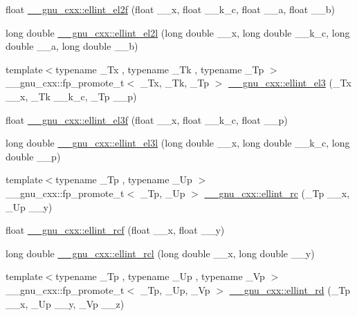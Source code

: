 \begin{DoxyCompactItemize}
\item 
float \hyperlink{group__mathsf__gnu_ga0bf7469fe7ac92e9a2ffa0f92ea62248}{\+\_\+\+\_\+gnu\+\_\+cxx\+::ellint\+\_\+el2f} (float \+\_\+\+\_\+x, float \+\_\+\+\_\+k\+\_\+c, float \+\_\+\+\_\+a, float \+\_\+\+\_\+b)
\item 
long double \hyperlink{group__mathsf__gnu_ga491439a09e6000659444f52dc3c9f215}{\+\_\+\+\_\+gnu\+\_\+cxx\+::ellint\+\_\+el2l} (long double \+\_\+\+\_\+x, long double \+\_\+\+\_\+k\+\_\+c, long double \+\_\+\+\_\+a, long double \+\_\+\+\_\+b)
\item 
{\footnotesize template$<$typename \+\_\+\+Tx , typename \+\_\+\+Tk , typename \+\_\+\+Tp $>$ }\\\+\_\+\+\_\+gnu\+\_\+cxx\+::fp\+\_\+promote\+\_\+t$<$ \+\_\+\+Tx, \+\_\+\+Tk, \+\_\+\+Tp $>$ \hyperlink{group__mathsf__gnu_gaac07922e08fdf46cd509ff0cfa9ea1f0}{\+\_\+\+\_\+gnu\+\_\+cxx\+::ellint\+\_\+el3} (\+\_\+\+Tx \+\_\+\+\_\+x, \+\_\+\+Tk \+\_\+\+\_\+k\+\_\+c, \+\_\+\+Tp \+\_\+\+\_\+p)
\item 
float \hyperlink{group__mathsf__gnu_ga66131a8ecc14b5228a73a01121f60a35}{\+\_\+\+\_\+gnu\+\_\+cxx\+::ellint\+\_\+el3f} (float \+\_\+\+\_\+x, float \+\_\+\+\_\+k\+\_\+c, float \+\_\+\+\_\+p)
\item 
long double \hyperlink{group__mathsf__gnu_ga0d90e66f799a2ebe4bec43eef0d53355}{\+\_\+\+\_\+gnu\+\_\+cxx\+::ellint\+\_\+el3l} (long double \+\_\+\+\_\+x, long double \+\_\+\+\_\+k\+\_\+c, long double \+\_\+\+\_\+p)
\item 
{\footnotesize template$<$typename \+\_\+\+Tp , typename \+\_\+\+Up $>$ }\\\+\_\+\+\_\+gnu\+\_\+cxx\+::fp\+\_\+promote\+\_\+t$<$ \+\_\+\+Tp, \+\_\+\+Up $>$ \hyperlink{group__mathsf__gnu_ga7d3d42f5f71a74266be8aaca528056bf}{\+\_\+\+\_\+gnu\+\_\+cxx\+::ellint\+\_\+rc} (\+\_\+\+Tp \+\_\+\+\_\+x, \+\_\+\+Up \+\_\+\+\_\+y)
\item 
float \hyperlink{group__mathsf__gnu_gaad5316092224ec3d92b66e79ef266adf}{\+\_\+\+\_\+gnu\+\_\+cxx\+::ellint\+\_\+rcf} (float \+\_\+\+\_\+x, float \+\_\+\+\_\+y)
\item 
long double \hyperlink{group__mathsf__gnu_ga9b2f1cdeacd3615c702a77d995a0129c}{\+\_\+\+\_\+gnu\+\_\+cxx\+::ellint\+\_\+rcl} (long double \+\_\+\+\_\+x, long double \+\_\+\+\_\+y)
\item 
{\footnotesize template$<$typename \+\_\+\+Tp , typename \+\_\+\+Up , typename \+\_\+\+Vp $>$ }\\\+\_\+\+\_\+gnu\+\_\+cxx\+::fp\+\_\+promote\+\_\+t$<$ \+\_\+\+Tp, \+\_\+\+Up, \+\_\+\+Vp $>$ \hyperlink{group__mathsf__gnu_gad29dae6abc783c8fe952dba477e65309}{\+\_\+\+\_\+gnu\+\_\+cxx\+::ellint\+\_\+rd} (\+\_\+\+Tp \+\_\+\+\_\+x, \+\_\+\+Up \+\_\+\+\_\+y, \+\_\+\+Vp \+\_\+\+\_\+z)

\end{DoxyCompactItemize}
